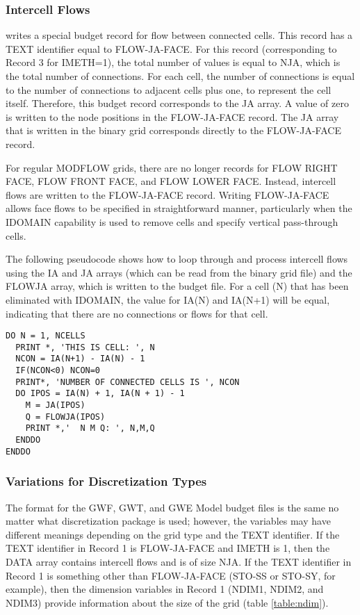 \subsubsection{Intercell Flows}

\mf writes a special budget record for flow between connected cells. This record has a TEXT identifier equal to FLOW-JA-FACE. For this record (corresponding to Record 3 for IMETH=1), the total number of values is equal to NJA, which is the total number of connections.  For each cell, the number of connections is equal to the number of connections to adjacent cells plus one, to represent the cell itself. Therefore, this budget record corresponds to the JA array. A value of zero is written to the node positions in the FLOW-JA-FACE record.  The JA array that is written in the binary grid corresponds directly to the FLOW-JA-FACE record.

For regular MODFLOW grids, there are no longer records for FLOW RIGHT FACE, FLOW FRONT FACE,  and FLOW LOWER FACE.  Instead, intercell flows are written to the FLOW-JA-FACE record.  Writing FLOW-JA-FACE allows face flows to be specified in straightforward manner, particularly when the IDOMAIN capability is used to remove cells and specify vertical pass-through cells.  

The following pseudocode shows how to loop through and process intercell flows using the IA and JA arrays (which can be read from the binary grid file) and the FLOWJA array, which is written to the budget file.  For a cell (N) that has been eliminated with IDOMAIN, the value for IA(N) and IA(N+1) will be equal, indicating that there are no connections or flows for that cell.

\begin{verbatim}
DO N = 1, NCELLS
  PRINT *, 'THIS IS CELL: ', N
  NCON = IA(N+1) - IA(N) - 1
  IF(NCON<0) NCON=0
  PRINT*, 'NUMBER OF CONNECTED CELLS IS ', NCON
  DO IPOS = IA(N) + 1, IA(N + 1) - 1
    M = JA(IPOS)
    Q = FLOWJA(IPOS)
    PRINT *,'  N M Q: ', N,M,Q
  ENDDO
ENDDO
\end{verbatim}
 
\subsubsection{Variations for Discretization Types}
The format for the GWF, GWT, and GWE Model budget files is the same no matter what discretization package is used; however, the variables may have different meanings depending on the grid type and the TEXT identifier.  If the TEXT identifier in Record 1 is FLOW-JA-FACE and IMETH is 1, then the DATA array contains intercell flows and is of size NJA.  If the TEXT identifier in Record 1 is something other than FLOW-JA-FACE (STO-SS or STO-SY, for example), then the dimension variables in Record 1 (NDIM1, NDIM2, and NDIM3) provide information about the size of the grid (table \ref{table:ndim}).  

